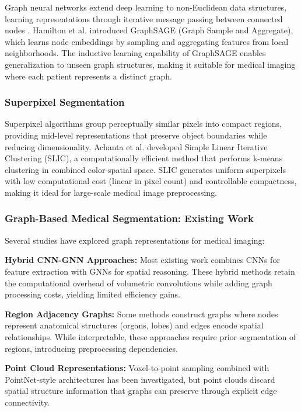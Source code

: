 Graph neural networks extend deep learning to non-Euclidean data structures, learning representations through iterative message passing between connected nodes \cite{hamilton2017graphsage, kipf2017gcn}. Hamilton et al. \cite{hamilton2017graphsage} introduced GraphSAGE (Graph Sample and Aggregate), which learns node embeddings by sampling and aggregating features from local neighborhoods. The inductive learning capability of GraphSAGE enables generalization to unseen graph structures, making it suitable for medical imaging where each patient represents a distinct graph.

\subsubsection{Superpixel Segmentation}

Superpixel algorithms group perceptually similar pixels into compact regions, providing mid-level representations that preserve object boundaries while reducing dimensionality. Achanta et al. \cite{achanta2012slic} developed Simple Linear Iterative Clustering (SLIC), a computationally efficient method that performs k-means clustering in combined color-spatial space. SLIC generates uniform superpixels with low computational cost (linear in pixel count) and controllable compactness, making it ideal for large-scale medical image preprocessing.

\subsubsection{Graph-Based Medical Segmentation: Existing Work}

Several studies have explored graph representations for medical imaging:

\textbf{Hybrid CNN-GNN Approaches:} Most existing work combines CNNs for feature extraction with GNNs for spatial reasoning. These hybrid methods retain the computational overhead of volumetric convolutions while adding graph processing costs, yielding limited efficiency gains.

\textbf{Region Adjacency Graphs:} Some methods construct graphs where nodes represent anatomical structures (organs, lobes) and edges encode spatial relationships. While interpretable, these approaches require prior segmentation of regions, introducing preprocessing dependencies.

\textbf{Point Cloud Representations:} Voxel-to-point sampling combined with PointNet-style architectures has been investigated, but point clouds discard spatial structure information that graphs can preserve through explicit edge connectivity.

